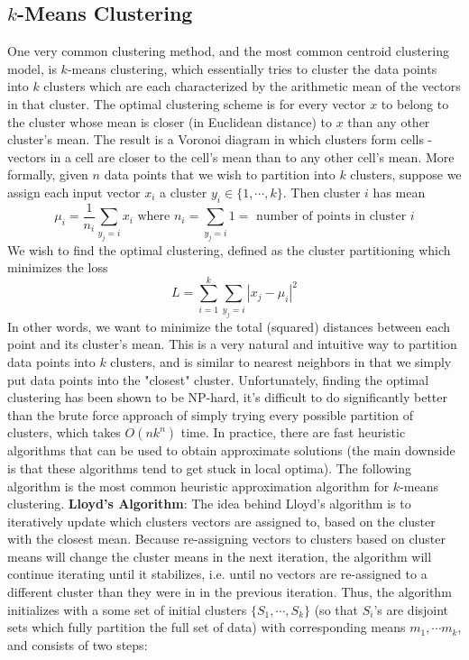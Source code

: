 \documentclass{article}
\begin{document}
\subsection{$ k $-Means Clustering}
One very common clustering method, and the most common centroid clustering model, is $ k $-means clustering, which essentially tries to cluster the data points into $ k $ clusters which are each characterized by the arithmetic mean of the vectors in that cluster. The optimal clustering scheme is for every vector $ x $ to belong to the cluster whose mean is closer (in Euclidean distance) to $ x $ than any other cluster's mean. The result is a Voronoi diagram in which clusters form cells - vectors in a cell are closer to the cell's mean than to any other cell's mean.
\newline
More formally, given $ n $ data points that we wish to partition into $ k $ clusters, suppose we assign each input vector $ x_i $ a cluster $ y_i \in \{ 1, \cdots, k \} $. Then cluster $ i $ has mean
$$ \mu_i = \frac{1}{n_i} \sum_{y_j = i} x_i \text{ where } n_i = \sum_{y_j = i} 1 = \text{ number of points in cluster } i $$
We wish to find the optimal clustering, defined as the cluster partitioning which minimizes the loss
$$ L = \sum_{i = 1}^k \sum_{y_j = i} | x_j - \mu_i |^2 $$
In other words, we want to minimize the total (squared) distances between each point and its cluster's mean.
\newline
This is a very natural and intuitive way to partition data points into $ k $ clusters, and is similar to nearest neighbors in that we simply put data points into the "closest" cluster. Unfortunately, finding the optimal clustering has been shown to be NP-hard, it's difficult to do significantly better than the brute force approach of simply trying every possible partition of clusters, which takes $ O(n k^n) $ time. In practice, there are fast heuristic algorithms that can be used to obtain approximate solutions (the main downside is that these algorithms tend to get stuck in local optima). The following algorithm is the most common heuristic approximation algorithm for $ k $-means clustering.
\newline \newline
\textbf{Lloyd's Algorithm}: The idea behind Lloyd's algorithm is to iteratively update which clusters vectors are assigned to, based on the cluster with the closest mean. Because re-assigning vectors to clusters based on cluster means will change the cluster means in the next iteration, the algorithm will continue iterating until it stabilizes, i.e. until no vectors are re-assigned to a different cluster than they were in in the previous iteration. Thus, the algorithm initializes with a some set of initial clusters $ \{ S_1, \cdots, S_k \} $ (so that $ S_i $'s are disjoint sets which fully partition the full set of data) with corresponding means $ m_1, \cdots m_k $, and consists of two steps:
\end{document}

